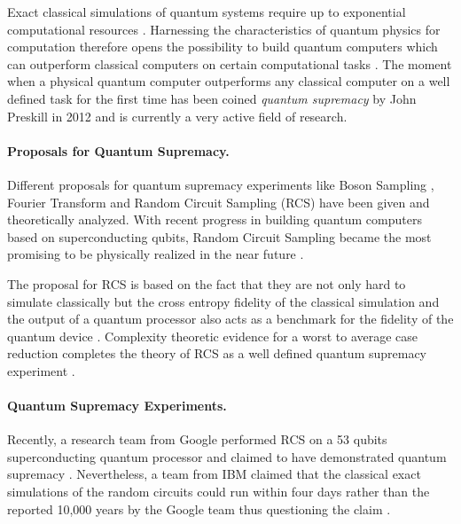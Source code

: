Exact classical simulations of quantum systems require up to exponential computational resources \cite{feynman1999simulating}.
Harnessing the characteristics of quantum physics for computation therefore opens the possibility to build quantum computers which can outperform classical computers on 
certain computational tasks \cite{shor1999polynomial}. The moment when a physical quantum computer outperforms any classical computer on a well defined task
for the first time has been coined \textit{quantum supremacy} by John
Preskill in 2012 and is currently a very active field of research.

\paragraph{Proposals for Quantum Supremacy.}
Different proposals for quantum supremacy experiments like Boson Sampling \cite{aaronson2010computational}, Fourier Transform \cite{fefferman2015power} and Random Circuit Sampling (RCS) \cite{boixo2018characterizing} have
been given and theoretically analyzed. With recent progress in building quantum computers based on 
superconducting qubits, Random Circuit Sampling became the most promising to be physically realized in the near future \cite{boul2018quantum}.

The proposal for RCS is based on the fact that they are not only hard 
to simulate classically but the cross entropy fidelity of the classical simulation and the output of a 
quantum processor also acts as a benchmark for the fidelity of the quantum device \cite{boixo2018characterizing}. Complexity theoretic 
evidence for a worst to average case reduction completes the theory of 
RCS as a well defined quantum supremacy experiment \cite{boul2018quantum}.

\paragraph{Quantum Supremacy Experiments.}
Recently, a research team from Google performed RCS on a 53 qubits superconducting 
quantum processor and claimed to have demonstrated quantum supremacy \cite{google2019supremacy}. Nevertheless, a team from IBM 
claimed that the classical exact simulations of the random circuits could run within four days
rather than the reported 10,000 years by the Google team thus questioning the claim \cite{pednault2019leveraging}.

